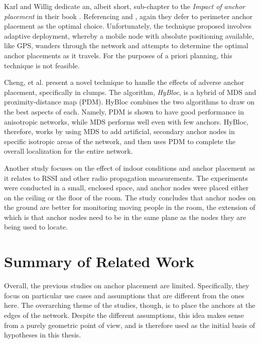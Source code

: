 Karl and Willig dedicate an, albeit short, sub-chapter to the \emph{Impact of anchor placement} in their book \cite[p. 247-248]{Karl}.  Referencing \cite{Doherty} and \cite{Savarese}, again they defer to perimeter anchor placement as the optimal choice.  Unfortunately, the technique proposed involves adaptive deployment, whereby a mobile node with absolute positioning available, like GPS, wanders through the network and attempts to determine the optimal anchor placements as it travels.  For the purposes of a priori planning, this technique is not feasible.

Cheng, et al.\cite{Cheng} present a novel technique to handle the effects of adverse anchor placement, specifically in clumps.  The algorithm, \emph{HyBloc}, is a hybrid of MDS and proximity-distance map (PDM)\cite{PDM}.  HyBloc combines the two algorithms to draw on the best aspects of each. Namely, PDM is shown to have good performance in anisotropic networks, while MDS performs well even with few anchors.  HyBloc, therefore, works by using MDS to add artificial, secondary anchor nodes in specific isotropic areas of the network, and then uses PDM to complete the overall localization for the entire network.

Another study focuses on the effect of indoor conditions and anchor placement as it relates to RSSI and other radio propagation measurements\cite{Zemek}.  The experiments were conducted in a small, enclosed space, and anchor nodes were placed either on the ceiling or the floor of the room.  The study concludes that anchor nodes on the ground are better for monitoring moving people in the room, the extension of which is that anchor nodes need to be in the same plane as the nodes they are being used to locate.

\section{Summary of Related Work}

Overall, the previous studies on anchor placement are limited.  Specifically, they focus on particular use cases and assumptions that are different from the ones here. The overarching theme of the studies, though, is to place the anchors at the edges of the network.  Despite the different assumptions, this idea makes sense from a purely geometric point of view, and is therefore used as the initial basis of hypotheses in this thesis.

